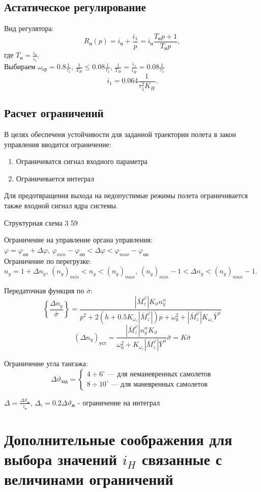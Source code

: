 \documentclass{article}
\begin{document}
\subsection{Астатическое регулирование}
Вид регулятора:
\[
R_н(p) = i_н +\frac{i_1}{p}  = i_н \frac{T_н p  + 1}{T_н p},
\]
где $T_н =\frac{i_н}{i_1}$.\\
Выбираем $\omega_{ср} = 0.8 \frac{1}{\tau_1}$, $\frac{1}{T_H} \le 0.08\frac{1}{\tau_1}$, $\frac{1}{T_H} = \frac{i_1}{i_H} = 0.08\frac{1}{\tau_1}$
\[
    i_1 = 0.064 \frac{1}{\tau_1^2 K_H}
.\]

\subsection{Расчет ограничений}
В целях обеспеченя устойчивости для заданной траектории полета в закон управления вводится ограничение:
\begin{enumerate}
    \item Ограничеватся сигнал входного параметра
    \item Ограничевается интеграл
\end{enumerate}

Для предотвращения выхода на недопустимые режимы полета ограничивается также входной сигнал ядра системы.

Структурная схема 3 59

Ограничение на управление органа управления:\\
$\varphi = \varphi_{оп} + \Delta \varphi$, $\varphi_{min} - \varphi_{оп} < \Delta \varphi < \varphi_{max} - \varphi_{оп}$\\
Ограничение по перегрузке:\\
$n_y = 1 + \Delta n_y$, $(n_y)_{min} < n_y < (n_y)_{max}$, $(n_y)_{min} - 1 < \Delta n_y < (n_y)_{max} - 1$.  

Передаточная функция по $\bar{\sigma}$:
\[
    \left\{\frac{\Delta n_y}{\bar{\sigma}} \right\} =\frac{|\bar{M}_z^\varphi| K_{\vartheta} n_y^\alpha}{ p^2 + 2(h + 0.5 K_{\omega_z} | \bar{M}_z^{\varphi} |)p + \omega_0^2 + | \bar{M}_z^{\varphi}| K_{\omega_z} \bar{Y}^\alpha} 
\]
\[
    \left( \Delta n_y\right)_{уст} = \frac{| \bar{M}_z^{\varphi}| n_y^\alpha K_\vartheta}{\omega_0^2 + K_{\omega_z} | \bar{M}_z^{\varphi} | \bar{Y}^\alpha} \bar{\sigma} = K \bar{\sigma}
\]

Ограничение угла тангажа:
\begin{equation}
    \Delta \vartheta_{зад} =
\begin{cases}
    4 \div 6^\circ \text{ --- для неманевренных самолетов}\\
    8 \div 10^\circ \text{ --- для маневренных самолетов}

\end{cases}    
\end{equation}

$\Delta =\frac{\Delta \vartheta_ж}{i_н}$, $\Delta_i = 0.2 \Delta \vartheta_ж$ - ограничение на интеграл

\section{Дополнительные соображения для выбора значений $i_H$ связанные с величинами ограничений}
\end{document}
